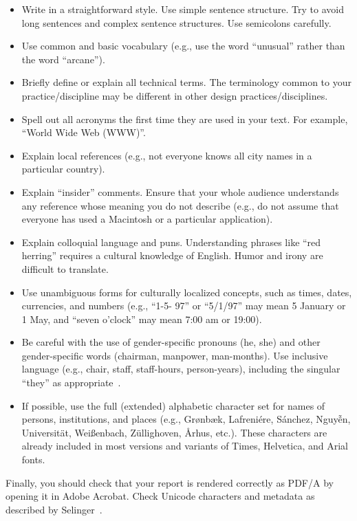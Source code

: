 \documentclass{article}
\begin{document}
\begin{itemize}
\item Write in a straightforward style. Use simple sentence
  structure. Try to avoid long sentences and complex sentence
  structures. Use semicolons carefully.
\item Use common and basic vocabulary (e.g., use the word ``unusual''
  rather than the word ``arcane'').
\item Briefly define or explain all technical terms. The terminology
  common to your practice/discipline may be different in other design
  practices/disciplines.
\item Spell out all acronyms the first time they are used in your
  text. For example, ``World Wide Web (WWW)''.
\item Explain local references (e.g., not everyone knows all city
  names in a particular country).
\item Explain ``insider'' comments. Ensure that your whole audience
  understands any reference whose meaning you do not describe (e.g.,
  do not assume that everyone has used a Macintosh or a particular
  application).
\item Explain colloquial language and puns. Understanding phrases like
  ``red herring'' requires a cultural knowledge of English. Humor and
  irony are difficult to translate.
\item Use unambiguous forms for culturally localized concepts, such as
  times, dates, currencies, and numbers (e.g., ``1-5- 97'' or
  ``5/1/97'' may mean 5 January or 1 May, and ``seven o'clock'' may
  mean 7:00 am or 19:00).
\item Be careful with the use of gender-specific pronouns (he, she)
  and other gender-specific words (chairman, manpower,
  man-months). Use inclusive language (e.g., chair,
  staff, staff-hours, person-years), including the singular 
 ``they'' as appropriate~\cite{OED:they}. 
\item If possible, use the full (extended) alphabetic character set
  for names of persons, institutions, and places (e.g.,
  Gr{\o}nb{\ae}k, Lafreni\'ere, S\'anchez, Nguy{\~{\^{e}}}n,
  Universit{\"a}t, Wei{\ss}enbach, Z{\"u}llighoven, \r{A}rhus, etc.).
  These characters are already included in most versions and variants
  of Times, Helvetica, and Arial fonts.
\end{itemize}

Finally, you should check that your report is rendered correctly as PDF/A by opening it in Adobe Acrobat. Check Unicode characters and metadata as described by Selinger~\cite{Selinger:pdfa}.
\end{document}
